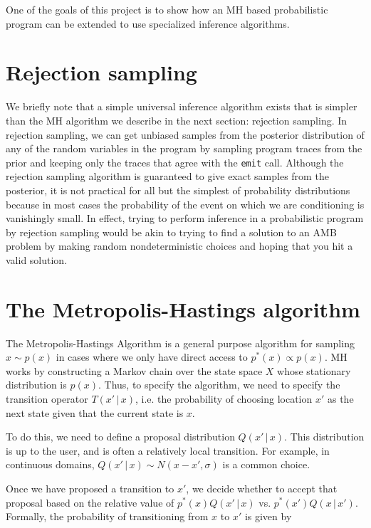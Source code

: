 \documentclass{article}
\begin{document}
One of the goals of this project is to show how an MH based probabilistic
program can be extended to use specialized inference algorithms. 

\section{Rejection sampling}
We briefly note that a simple universal inference algorithm exists that is
simpler than the MH algorithm we describe in the next section: rejection sampling.
In rejection sampling, we can get unbiased samples from the posterior
distribution of any of the random variables in the program by sampling program
traces from the prior and keeping only the traces that agree with the
\verb+emit+ call. Although the rejection sampling algorithm is
guaranteed to give exact samples from the posterior, it is not practical for
all but the simplest of probability  distributions because in most cases the
probability of the event on which we are conditioning is vanishingly small. In
effect, trying to perform inference in a probabilistic program by rejection
sampling would be akin to trying to find a solution to an AMB problem by making
random nondeterministic choices and hoping that you hit a valid solution.

\section{The Metropolis-Hastings algorithm}

The Metropolis-Hastings Algorithm is a general purpose algorithm for sampling $x
\sim p(x)$ in cases where we only have direct access to $p^*(x) \propto
p(x)$. MH works by constructing a Markov chain over the state space $X$ whose
stationary distribution is $p(x)$. Thus, to specify the algorithm, we need to
specify the transition operator $T(x'\,|\,x)$, i.e. the probability of choosing
location $x'$ as the next state given that the current state is $x$. 

To do this, we need to define a proposal distribution $Q(x' \, | \, x)$. This
distribution is up to the user, and is often a relatively local transition. For
example, in continuous domains, $Q(x' \, | \, x) \sim N(x-x', \sigma)$ is a common
choice. 

Once we have proposed a transition to $x'$, we decide whether to accept that
proposal based on the relative value of $p^*(x) Q(x' \,| \, x)$ vs. $p^*(x') Q(x
\,| \, x')$. Formally, the probability of transitioning from $x$ to $x'$ is
given by  
\end{document}
